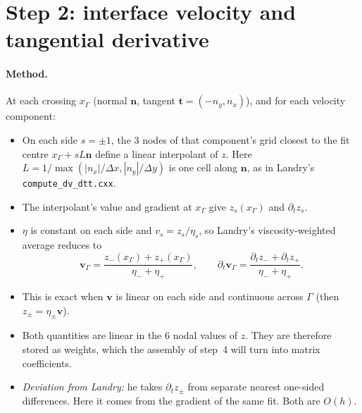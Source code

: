 \documentclass[11pt,a4paper]{article}
\newcommand{\code}[1]{\texttt{#1}}
\begin{document}
\section{Step 2: interface velocity and tangential derivative}\label{sec:s2}

\paragraph{Method.} At each crossing $x_\Gamma$ (normal $\mathbf n$, tangent
$\mathbf t=(-n_y,n_x)$), and for each velocity component:
\begin{itemize}
  \item On each side $s=\pm1$, the 3 nodes of that component's grid closest to the fit centre
    $x_\Gamma+sL\mathbf n$ define a linear interpolant of $z$. Here
    $L=1/\max(|n_x|/\Delta x,|n_y|/\Delta y)$ is one cell along $\mathbf n$, as in Landry's
    \code{compute\_dv\_dtt.cxx}.
  \item The interpolant's value and gradient at $x_\Gamma$ give $z_s(x_\Gamma)$ and $\partial_t z_s$.
  \item $\eta$ is constant on each side and $v_s=z_s/\eta_s$, so Landry's viscosity-weighted
    average reduces to
    \[
    \mathbf v_\Gamma=\frac{z_-(x_\Gamma)+z_+(x_\Gamma)}{\eta_-+\eta_+},\qquad
    \partial_t\mathbf v_\Gamma=\frac{\partial_t z_-+\partial_t z_+}{\eta_-+\eta_+}.
    \]
  \item This is exact when $\mathbf v$ is linear on each side and continuous across $\Gamma$
    (then $z_\pm=\eta_\pm\mathbf v$).
  \item Both quantities are linear in the 6 nodal values of $z$. They are therefore stored as
    weights, which the assembly of step~4 will turn into matrix coefficients.
  \item \emph{Deviation from Landry:} he takes $\partial_t z_\pm$ from separate nearest
    one-sided differences. Here it comes from the gradient of the same fit. Both are $O(h)$.
\end{itemize}
\end{document}
